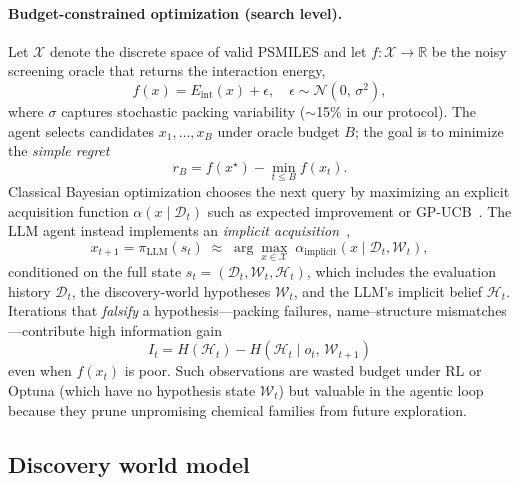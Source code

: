 \documentclass[twocolumn]{fairmeta}
\begin{document}
\paragraph{Budget-constrained optimization (search level).}
Let $\mathcal{X}$ denote the discrete space of valid PSMILES and let $f\!:\!\mathcal{X}\!\to\!\mathbb{R}$ be the noisy screening oracle that returns the interaction energy,
\begin{equation}
f(x) = E_\text{int}(x) + \epsilon, \quad \epsilon \sim \mathcal{N}(0,\,\sigma^2),
\label{eq:oracle}
\end{equation}
where $\sigma$ captures stochastic packing variability (${\sim}$15\% in our protocol).
The agent selects candidates $x_1,\ldots,x_B$ under oracle budget $B$; the goal is to minimize the \emph{simple regret}~\cite{shahriari2016bayesopt,srinivas2010gpucb}
\begin{equation}
r_B = f(x^\star) - \min_{t \le B} f(x_t).
\label{eq:regret}
\end{equation}
Classical Bayesian optimization chooses the next query by maximizing an explicit acquisition function $\alpha(x \mid \mathcal{D}_t)$ such as expected improvement or GP-UCB~\cite{srinivas2010gpucb}.
The LLM agent instead implements an \emph{implicit acquisition}~\cite{yang2024opro,liu2025igpo},
\begin{equation}
x_{t+1} = \pi_\text{LLM}(s_t) \;\approx\; \arg\max_{x\in\mathcal{X}}\; \alpha_\text{implicit}(x \mid \mathcal{D}_t, \mathcal{W}_t),
\label{eq:implicit_acq}
\end{equation}
conditioned on the full state $s_t = (\mathcal{D}_t, \mathcal{W}_t, \mathcal{H}_t)$, which includes the evaluation history $\mathcal{D}_t$, the discovery-world hypotheses $\mathcal{W}_t$, and the LLM's implicit belief $\mathcal{H}_t$.
Iterations that \emph{falsify} a hypothesis---packing failures, name--structure mismatches---contribute high information gain
\begin{equation}
I_t = H(\mathcal{H}_t) - H(\mathcal{H}_t \mid o_t,\, \mathcal{W}_{t+1})
\label{eq:infogain}
\end{equation}
even when $f(x_t)$ is poor.
Such observations are wasted budget under RL or Optuna (which have no hypothesis state $\mathcal{W}_t$) but valuable in the agentic loop because they prune unpromising chemical families from future exploration.

\subsection{Discovery world model}
\end{document}
